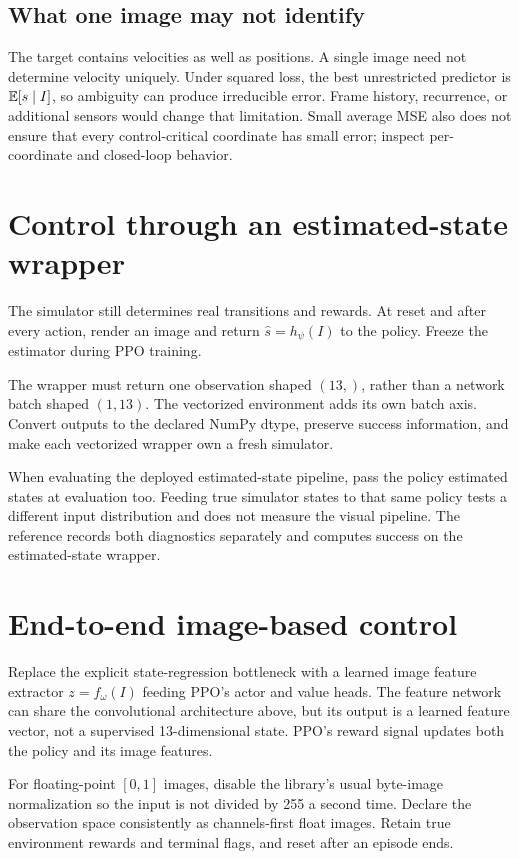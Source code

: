 \subsection{What one image may not identify}
The target contains velocities as well as positions. A single image need
not determine velocity uniquely. Under squared loss, the best unrestricted
predictor is $\mathbb{E}[s\mid I]$, so ambiguity can produce irreducible error.
Frame history, recurrence, or additional sensors would change that limitation.
Small average MSE also does not ensure that every control-critical coordinate
has small error; inspect per-coordinate and closed-loop behavior.

\newpage
\section{Control through an estimated-state wrapper}
The simulator still determines real transitions and rewards. At reset and
after every action, render an image and return $\widehat s=h_\psi(I)$ to the
policy. Freeze the estimator during PPO training.

The wrapper must return one observation shaped $(13,)$, rather than a
network batch shaped $(1,13)$. The vectorized environment adds its own
batch axis. Convert outputs to the declared NumPy dtype, preserve success
information, and make each vectorized wrapper own a fresh simulator.

When evaluating the deployed estimated-state pipeline, pass the policy
estimated states at evaluation too. Feeding true simulator states to that
same policy tests a different input distribution and does not measure the
visual pipeline. The reference records both diagnostics separately and
computes success on the estimated-state wrapper.

\section{End-to-end image-based control}
Replace the explicit state-regression bottleneck with a learned image
feature extractor $z=f_\omega(I)$ feeding PPO's actor and value heads.
The feature network can share the convolutional architecture above, but
its output is a learned feature vector, not a supervised 13-dimensional state.
PPO's reward signal updates both the policy and its image features.

For floating-point $[0,1]$ images, disable the library's usual byte-image
normalization so the input is not divided by 255 a second time. Declare the
observation space consistently as channels-first float images. Retain true
environment rewards and terminal flags, and reset after an episode ends.

